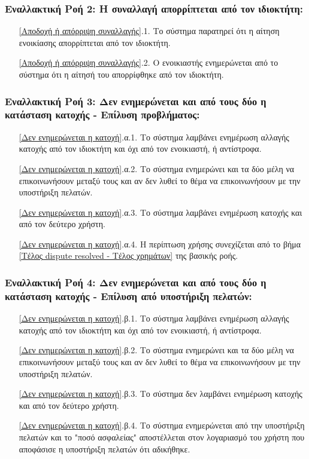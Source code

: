 \documentclass[12pt,a4paper]{article}
\begin{document}
\subsubsection*{Εναλλακτική Ροή 2: Η συναλλαγή απορρίπτεται από τον ιδιοκτήτη:}
\begin{enumerate}
    \item[\ref{Αποδοχή ή απόρριψη συναλλαγής}.1.] Το σύστημα παρατηρεί ότι η αίτηση ενοικίασης απορρίπτεται από τον ιδιοκτήτη.
    \item[\ref{Αποδοχή ή απόρριψη συναλλαγής}.2.] Ο ενοικιαστής ενημερώνεται από το σύστημα ότι η αίτησή του απορρίφθηκε από τον ιδιοκτήτη.
\end{enumerate}

\subsubsection*{Εναλλακτική Ροή 3: Δεν ενημερώνεται και από τους δύο η κατάσταση κατοχής - Επίλυση προβλήματος:}
\begin{enumerate}
    \item[\ref{Δεν ενημερώνεται η κατοχή}.α.1.] Το σύστημα λαμβάνει ενημέρωση αλλαγής κατοχής από τον ιδιοκτήτη και όχι από τον ενοικιαστή, ή αντίστροφα.
    \item[\ref{Δεν ενημερώνεται η κατοχή}.α.2.] Το σύστημα ενημερώνει και τα δύο μέλη να επικοινωνήσουν μεταξύ τους και αν δεν λυθεί το θέμα να επικοινωνήσουν με την υποστήριξη πελατών.
    \item[\ref{Δεν ενημερώνεται η κατοχή}.α.3.] Το σύστημα λαμβάνει ενημέρωση κατοχής και από τον δεύτερο χρήστη.
    \item[\ref{Δεν ενημερώνεται η κατοχή}.α.4.] Η περίπτωση χρήσης συνεχίζεται από το βήμα \ref{Τέλος dispute resolved - Τέλος χρημάτων} της βασικής ροής.
\end{enumerate}

\subsubsection*{Εναλλακτική Ροή 4: Δεν ενημερώνεται και από τους δύο η κατάσταση κατοχής - Επίλυση από υποστήριξη πελατών:}
\begin{enumerate}
    \item[\ref{Δεν ενημερώνεται η κατοχή}.β.1.] Το σύστημα λαμβάνει ενημέρωση αλλαγής κατοχής από τον ιδιοκτήτη και όχι από τον ενοικιαστή, ή αντίστροφα.
    \item[\ref{Δεν ενημερώνεται η κατοχή}.β.2.] Το σύστημα ενημερώνει και τα δύο μέλη να επικοινωνήσουν μεταξύ τους και αν δεν λυθεί το θέμα να επικοινωνήσουν με την υποστήριξη πελατών.
    \item[\ref{Δεν ενημερώνεται η κατοχή}.β.3.] Το σύστημα δεν λαμβάνει ενημέρωση κατοχής και από τον δεύτερο χρήστη.
    \item[\ref{Δεν ενημερώνεται η κατοχή}.β.4.] Το σύστημα ενημερώνεται από την υποστήριξη πελατών και το "ποσό ασφαλείας" αποστέλλεται στον λογαριασμό του χρήστη που αποφάσισε η υποστήριξη πελατών ότι αδικήθηκε.
\end{enumerate}
\end{document}
